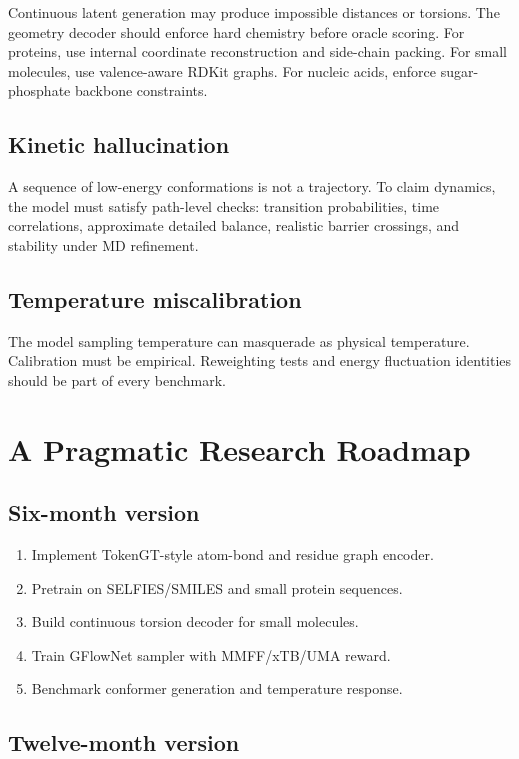 \documentclass[11pt]{article}
\begin{document}
Continuous latent generation may produce impossible distances or torsions. The geometry decoder should enforce hard chemistry before oracle scoring. For proteins, use internal coordinate reconstruction and side-chain packing. For small molecules, use valence-aware RDKit graphs. For nucleic acids, enforce sugar-phosphate backbone constraints.

\subsection{Kinetic hallucination}

A sequence of low-energy conformations is not a trajectory. To claim dynamics, the model must satisfy path-level checks: transition probabilities, time correlations, approximate detailed balance, realistic barrier crossings, and stability under MD refinement.

\subsection{Temperature miscalibration}

The model sampling temperature can masquerade as physical temperature. Calibration must be empirical. Reweighting tests and energy fluctuation identities should be part of every benchmark.

\section{A Pragmatic Research Roadmap}

\subsection{Six-month version}

\begin{enumerate}[leftmargin=2em]
  \item Implement TokenGT-style atom-bond and residue graph encoder.
  \item Pretrain on SELFIES/SMILES and small protein sequences.
  \item Build continuous torsion decoder for small molecules.
  \item Train GFlowNet sampler with MMFF/xTB/UMA reward.
  \item Benchmark conformer generation and temperature response.
\end{enumerate}

\subsection{Twelve-month version}
\end{document}
